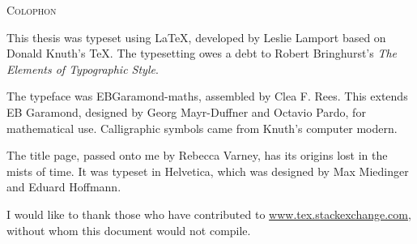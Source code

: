 {
  \thispagestyle{empty}
  \setlength{\parskip}{12pt}
  \setlength{\parindent}{0pt}


  \vspace*{\fill}
  \textsc{Colophon}

  This thesis was typeset using \LaTeX{}, developed by Leslie Lamport based on Donald Knuth's \TeX{}.
  The typesetting owes a debt to Robert Bringhurst's \emph{The Elements of Typographic Style}.

  The typeface was EBGaramond-maths, assembled by Clea F. Rees. This extends EB Garamond,
  designed by Georg Mayr-Duffner and Octavio Pardo, for mathematical use. Calligraphic
  symbols came from Knuth's computer modern.

  The title page, passed onto me by Rebecca Varney, has its origins lost in the mists of time. It was typeset in Helvetica,
  which was designed by Max Miedinger and Eduard Hoffmann.

  I would like to thank those who have contributed to \url{www.tex.stackexchange.com}, without whom this document would not compile.
  
  \vspace*{\fill}
}